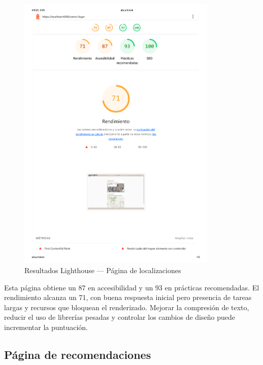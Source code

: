 \begin{figure}[h!tb]
  \centering
  \includegraphics[width=0.85\textwidth]{figs/localizaciones_lighthouse.png}
  \caption{Resultados Lighthouse — Página de localizaciones}
  \label{fig:lighthouse-localizaciones}
\end{figure}

Esta página obtiene un 87 en accesibilidad y un 93 en prácticas recomendadas. El rendimiento alcanza un 71, con buena respuesta inicial pero presencia de tareas largas y recursos que bloquean el renderizado. Mejorar la compresión de texto, reducir el uso de librerías pesadas y controlar los cambios de diseño puede incrementar la puntuación.

\subsection*{Página de recomendaciones}

